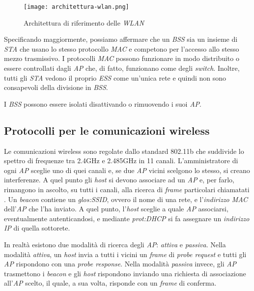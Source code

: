 \begin{figure}[h!]
    \centering
    \texttt{[image: architettura-wlan.png]}
    \caption{Architettura di riferimento delle \emph{WLAN}}
\end{figure}\noindent
Specificando maggiormente, possiamo affermare che un \emph{BSS} sia un insieme
di \emph{STA} che usano lo stesso protocollo \emph{MAC} e competono per
l'accesso allo stesso mezzo trasmissivo. I protocolli \emph{MAC} possono
funzionare in modo distribuito o essere controllati dagli \emph{AP} che, di
fatto, funzionano come degli \emph{switch}. Inoltre, tutti gli \emph{STA}
vedono il proprio \emph{ESS} come un'unica rete e quindi non sono consapevoli
della divisione in \emph{BSS}.

\begin{note}
    I \emph{BSS} possono essere isolati disattivando o rimuovendo i suoi
    \emph{AP}.
\end{note}

\subsection{Protocolli per le comunicazioni wireless}
Le comunicazioni wireless sono regolate dallo standard 802.11b che suddivide
lo spettro di frequenze tra 2.4GHz e 2.485GHz in 11 canali. L'amministratore di
ogni \emph{AP} sceglie uno di quei canali e, se due \emph{AP} vicini scelgono lo
stesso, si creano interferenze. A quel punto gli \emph{host} si devono associare
ad un \emph{AP} e, per farlo, rimangono in ascolto, su tutti i canali, alla
ricerca di \emph{frame} particolari chiamatati \emph{}. Un
\emph{beacon} contiene un \emph{\gls{glos:SSID}}, ovvero il nome di una rete,
e l'\emph{indirizzo MAC} dell'\emph{AP} che l'ha inviato. A quel punto,
l'\emph{host} sceglie a quale \emph{AP} associarsi, eventualmente autenticandosi,
e mediante \emph{\gls{prot:DHCP}} si fa assegnare un \emph{indirizzo IP} di
quella sottorete.

In realtà esistono due modalità di ricerca degli \emph{AP}: \emph{attiva} e
\emph{passiva}. Nella modalità \emph{attiva}, un \emph{host} invia a tutti i
vicini un \emph{frame} di \emph{probe request} e tutti gli \emph{AP} rispondono
con una \emph{probe response}. Nella modalità \emph{passiva} invece, gli \emph{AP}
trasmettono i \emph{beacon} e gli \emph{host} rispondono inviando una
richiesta di associazione all'\emph{AP} scelto, il quale, a sua volta, risponde
con un \emph{frame} di conferma.

